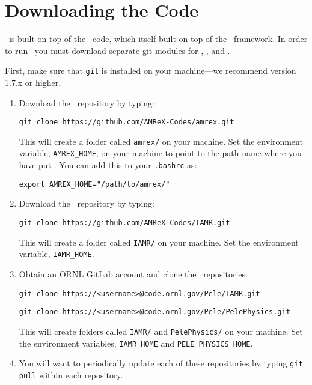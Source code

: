
\section{Downloading the Code}

\iamr\ is built on top of the \iamr\ code, which itself built on top of the \amrex\ framework.  In order to run
\iamr\, you must download separate git modules for \iamr, \iamr, and \amrex.

\vspace{.1in}

\noindent First, make sure that {\tt git} is installed on your machine---we recommend version 1.7.x or higher.

\vspace{.1in}

\begin{enumerate}

\item Download the \amrex\ repository by typing: 
\begin{verbatim}
git clone https://github.com/AMReX-Codes/amrex.git
\end{verbatim}

This will create a folder called {\tt amrex/} on your machine.
Set the environment variable, {\tt AMREX\_HOME}, on your
machine to point to the path name where you have put \amrex.
You can add this to your {\tt .bashrc} as:
\begin{verbatim}
export AMREX_HOME="/path/to/amrex/"
\end{verbatim}

\item Download the \iamr\ repository by typing: 
\begin{verbatim}
git clone https://github.com/AMReX-Codes/IAMR.git
\end{verbatim}

This will create a folder called {\tt IAMR/} on your machine.
Set the environment variable, {\tt IAMR\_HOME}.

\item Obtain an ORNL GitLab account and clone the \pele\ repositories:
\begin{verbatim}
git clone https://<username>@code.ornl.gov/Pele/IAMR.git
\end{verbatim}
\begin{verbatim}
git clone https://<username>@code.ornl.gov/Pele/PelePhysics.git
\end{verbatim}

This will create folders called {\tt IAMR/} and {\tt PelePhysics/} on your machine.
Set the environment variables, {\tt IAMR\_HOME} and {\tt PELE\_PHYSICS\_HOME}.

\item You will want to periodically update each of these repositories
by typing {\tt git pull} within each repository.

\end{enumerate}

